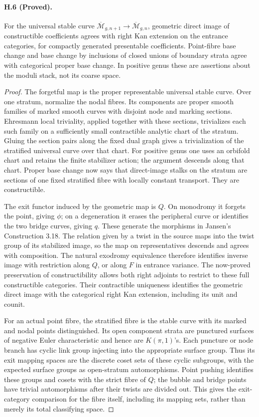 \paragraph{H.6 (Proved).}
For the universal stable curve
$\overline{\mathcal M}_{g,n+1}\to\overline{\mathcal M}_{g,n}$,
geometric direct image of constructible coefficients agrees with
right Kan extension on the entrance categories, for compactly
generated presentable coefficients. Point-fibre base change and
base change by inclusions of closed unions of boundary strata
agree with categorical proper base change. In positive genus
these are assertions about the moduli stack, not its coarse
space.
\begin{proof}
The forgetful map is the proper representable universal stable
curve. Over one stratum, normalize the nodal fibres. Its
components are proper smooth families of marked smooth curves
with disjoint node and marking sections. Ehresmann local
triviality, applied together with these sections, trivializes each
such family on a sufficiently small contractible analytic chart
of the stratum. Gluing the section pairs along the fixed dual
graph gives a trivialization of the stratified universal curve
over that chart. For positive genus one uses an orbifold chart
and retains the finite stabilizer action; the argument descends
along that chart. Proper base change now says that direct-image
stalks on the stratum are sections of one fixed stratified fibre
with locally constant transport. They are constructible.

The exit functor induced by the geometric map is $Q$. On
monodromy it forgets the point, giving $\phi$; on a degeneration
it erases the peripheral curve or identifies the two bridge
curves, giving $q$. These generate the morphisms in Jansen's
Construction 3.18. The relation given by a twist in the source
maps into the twist group of its stabilized image, so the map
on representatives descends and agrees with composition. The
natural exodromy equivalence therefore identifies inverse image
with restriction along $Q$, or along $F$ in entrance variance.
The now-proved preservation of constructibility allows both
right adjoints to restrict to these full constructible categories.
Their contractible uniqueness identifies the geometric direct
image with the categorical right Kan extension, including its
unit and counit.

For an actual point fibre, the stratified fibre is the stable
curve with its marked and nodal points distinguished. Its open
component strata are punctured surfaces of negative Euler
characteristic and hence are $K(\pi,1)$'s. Each puncture or
node branch has cyclic link group injecting into the appropriate
surface group. Thus its exit mapping spaces are the discrete
coset sets of these cyclic subgroups, with the expected surface
groups as open-stratum automorphisms. Point pushing identifies
these groups and cosets with the strict fibre of $Q$; the bubble
and bridge points have trivial automorphisms after their twists
are divided out. This gives the exit-category comparison for
the fibre itself, including its mapping sets, rather than merely
its total classifying space.


\end{proof}
